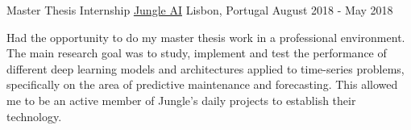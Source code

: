 \begin{cventries}
  \cventry
    {Master Thesis Internship} %
    {\href{https://www.jungle.ai}{Jungle AI}} %
    {Lisbon, Portugal} %
    {August 2018 - May 2018} %
    {
      \begin{cvitems} %
        \item {Had the opportunity to do my master thesis work in a professional environment. The main research goal was to study, implement and test the performance of different deep learning models and architectures applied to time-series problems, specifically on the area of predictive maintenance and forecasting. This allowed me to be an active member of Jungle’s daily projects to establish their technology.}
      \end{cvitems}
    }
\end{cventries}
